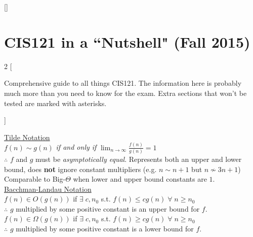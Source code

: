 \documentclass[12pt, fleqn]{general}
\begin{document}
\titleformat{\section}{\normalfont\LARGE\bfseries\centering}{\thesection}{1em}{}[{\titlerule[0.6pt]}]

\section*{CIS121 in a ``Nutshell" (Fall 2015)}
\vspace{-20pt}

    \fontsize{10pt}{12pt}
\begin{multicols*}{2}
[{\small \begin{center}Comprehensive guide to all things CIS121. The information here is probably much more than you need to know for the exam. Extra sections that won't be tested are marked with asterisks.\end{center}}]

    {\large \underline{Tilde Notation}}\\

    $f(n) \sim g(n)$ \emph{if and only if} $\lim_{n\rightarrow\infty} \frac{f(n)}{g(n)} = 1$\\ 

    $\therefore$ $f$ and $g$ must be \emph{asymptotically equal}. Represents both an upper and lower bound, does \textbf{not} ignore constant multipliers (e.g. $n \sim n + 1$ but $n \not\sim 3n + 1$) Comparable to Big-$\Theta$ when lower and upper bound constants are $1$.\\

    {\large \underline{Bacchman-Landau Notation}}\\

    $f(n) \in O(g(n))$ if $\exists\; c,n_0$ s.t. $f(n) \leq c g(n)\; \forall\; n \geq n_0$\\
    $\therefore$ $g$ multiplied by some positive constant is an upper bound for $f$.\\

    $f(n) \in \Omega(g(n))$ if $\exists\; c,n_0$ s.t. $f(n) \geq c g(n)\;\forall\; n \geq n_0$\\
    $\therefore$ $g$ multiplied by some positive constant is a lower bound for $f$.\\


\end{multicols*}
\end{document}
